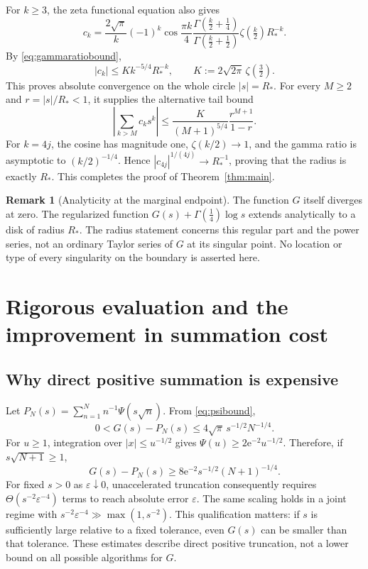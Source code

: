 \documentclass[11pt,a4paper]{article}
\numberwithin{equation}{section}
\theoremstyle{definition}
\newtheorem{remark}[theorem]{Remark}
\newcommand{\e}{\mathrm e}
\newcommand{\gfour}{\Gamma(\tfrac14)}
\begin{document}
For $k\ge3$, the zeta functional equation also gives
\begin{equation}
 c_k=\frac{2\sqrt\pi}{k}(-1)^k\cos\frac{\pi k}{4}
 \frac{\Gamma(\frac k2+\frac14)}{\Gamma(\frac k2+\frac12)}
 \zeta(\tfrac k2)R_*^{-k}.
 \label{eq:stablecoeff}
\end{equation}
By \eqref{eq:gammaratiobound},
\begin{equation}
 |c_k|\le K k^{-5/4}R_*^{-k},\qquad
 K:=2\sqrt{2\pi}\,\zeta(\tfrac32).
 \label{eq:coefbound}
\end{equation}
This proves absolute convergence on the whole circle $|s|=R_*$. For
every $M\ge2$ and $r=|s|/R_*<1$, it supplies the alternative tail bound
\begin{equation}
 \left|\sum_{k>M}c_k s^k\right|
 \le \frac{K}{(M+1)^{5/4}}\frac{r^{M+1}}{1-r}.
 \label{eq:geometrictail}
\end{equation}
For $k=4j$, the cosine has magnitude one, $\zeta(k/2)\to1$, and the
gamma ratio is asymptotic to $(k/2)^{-1/4}$. Hence
$|c_{4j}|^{1/(4j)}\to R_*^{-1}$, proving that the radius is exactly
$R_*$. This completes the proof of Theorem~\ref{thm:main}.

\begin{remark}[Analyticity at the marginal endpoint]
The function $G$ itself diverges at zero. The regularized function
$G(s)+\gfour\log s$ extends analytically to a disk of radius $R_*$.
The radius statement concerns this regular part and the power series,
not an ordinary Taylor series of $G$ at its singular point. No location
or type of every singularity on the boundary is asserted here.
\end{remark}

\section{Rigorous evaluation and the improvement in summation cost}
\label{sec:algorithm}

\subsection{Why direct positive summation is expensive}

Let $P_N(s)=\sum_{n=1}^N n^{-1}\Psi(s\sqrt n)$. From
\eqref{eq:psibound},
\begin{equation}
 0<G(s)-P_N(s)\le4\sqrt\pi\,s^{-1/2}N^{-1/4}.
 \label{eq:directupper}
\end{equation}
For $u\ge1$, integration over $|x|\le u^{-1/2}$ gives
$\Psi(u)\ge2\e^{-2}u^{-1/2}$. Therefore, if
$s\sqrt{N+1}\ge1$,
\begin{equation}
 G(s)-P_N(s)\ge8\e^{-2}s^{-1/2}(N+1)^{-1/4}.
 \label{eq:directlower}
\end{equation}
For fixed $s>0$ as $\varepsilon\downarrow0$, unaccelerated truncation
consequently requires $\Theta(s^{-2}\varepsilon^{-4})$ terms to reach
absolute error $\varepsilon$. The same scaling holds in a joint regime
with $s^{-2}\varepsilon^{-4}\gg\max(1,s^{-2})$. This qualification matters:
if $s$ is sufficiently large relative to a fixed tolerance, even $G(s)$
can be smaller than that tolerance. These estimates
describe direct positive truncation, not a lower bound on all possible
algorithms for $G$.
\end{document}
